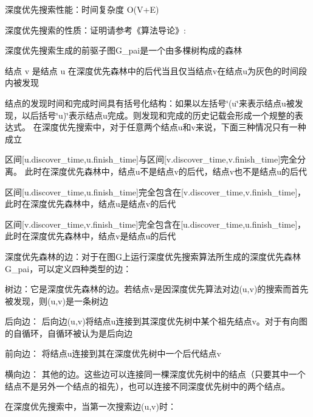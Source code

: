 深度优先搜索性能：时间复杂度 O(V+\+E)

深度优先搜索的性质：证明请参考《算法导论》\+:


\begin{DoxyItemize}
\item 深度优先搜索生成的前驱子图\+G\+\_\+pai是一个由多棵树构成的森林
\item 结点 v 是结点 u 在深度优先森林中的后代当且仅当结点v在结点u为灰色的时间段内被发现
\item 结点的发现时间和完成时间具有括号化结构：如果以左括号\char`\"{}(u\char`\"{}来表示结点u被发现，以后括号\char`\"{}u)\char`\"{}表示结点u完成。则发现和完成的历史记载会形成一个规整的表达式。 在深度优先搜索中，对于任意两个结点u和v来说，下面三种情况只有一种成立
\begin{DoxyItemize}
\item 区间\mbox{[}u.\+discover\+\_\+time,u.\+finish\+\_\+time\mbox{]}与区间\mbox{[}v.\+discover\+\_\+time,v.\+finish\+\_\+time\mbox{]}完全分离。 此时在深度优先森林中，结点u不是结点v的后代，结点v也不是结点u的后代
\item 区间\mbox{[}u.\+discover\+\_\+time,u.\+finish\+\_\+time\mbox{]}完全包含在\mbox{[}v.\+discover\+\_\+time,v.\+finish\+\_\+time\mbox{]}，此时在深度优先森林中，结点u是结点v的后代
\item 区间\mbox{[}v.\+discover\+\_\+time,v.\+finish\+\_\+time\mbox{]}完全包含在\mbox{[}u.\+discover\+\_\+time,u.\+finish\+\_\+time\mbox{]}，此时在深度优先森林中，结点v是结点u的后代
\end{DoxyItemize}
\end{DoxyItemize}

深度优先森林的边：对于在图\+G上运行深度优先搜索算法所生成的深度优先森林\+G\+\_\+pai，可以定义四种类型的边：


\begin{DoxyItemize}
\item 树边：它是深度优先森林的边。若结点v是因深度优先算法对边(u,v)的搜索而首先被发现，则(u,v)是一条树边
\item 后向边： 后向边(u,v)将结点u连接到其深度优先树中某个祖先结点v。对于有向图的自循环，自循环被认为是后向边
\item 前向边： 将结点u连接到其在深度优先树中一个后代结点v
\item 横向边： 其他的边。这些边可以连接同一棵深度优先树中的结点（只要其中一个结点不是另外一个结点的祖先），也可以连接不同深度优先树中的两个结点。
\end{DoxyItemize}

在深度优先搜索中，当第一次搜索边(u,v)时：


